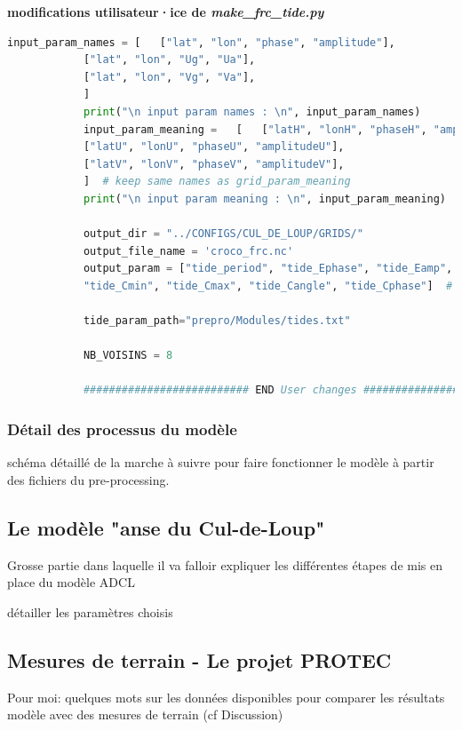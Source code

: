 \documentclass[10pt,a4paper,titlepage]{article}
\begin{document}
\begin{codeEnv}{\textbf{modifications utilisateur·ice de \textit{make\_frc\_tide.py}}}
\begin{lstlisting}[language=python]
            input_param_names = [   ["lat", "lon", "phase", "amplitude"],
            ["lat", "lon", "Ug", "Ua"],
            ["lat", "lon", "Vg", "Va"],
            ]
            print("\n input param names : \n", input_param_names)
            input_param_meaning =   [   ["latH", "lonH", "phaseH", "amplitudeH"],
            ["latU", "lonU", "phaseU", "amplitudeU"],
            ["latV", "lonV", "phaseV", "amplitudeV"],
            ]  # keep same names as grid_param_meaning
            print("\n input param meaning : \n", input_param_meaning)
            
            output_dir = "../CONFIGS/CUL_DE_LOUP/GRIDS/"
            output_file_name = 'croco_frc.nc'
            output_param = ["tide_period", "tide_Ephase", "tide_Eamp",
            "tide_Cmin", "tide_Cmax", "tide_Cangle", "tide_Cphase"]  # don't change the order
            
            tide_param_path="prepro/Modules/tides.txt"
            
            NB_VOISINS = 8
            
            ########################## END User changes ##########################
        \end{lstlisting}
    \end{codeEnv}
    
    \subsubsection{Détail des processus du modèle}
    schéma détaillé de la marche à suivre pour faire fonctionner le modèle à partir des fichiers du pre-processing.
    
    \subsection{Le modèle "anse du Cul-de-Loup"}
    
    Grosse partie dans laquelle il va falloir expliquer les différentes étapes de mis en place du modèle ADCL
    
    détailler les paramètres choisis
    
    \subsection{Mesures de terrain - Le projet PROTEC}
    
    Pour moi: quelques mots sur les données disponibles pour comparer les résultats modèle avec des mesures de terrain (cf Discussion)
    
    
    
\end{document}
